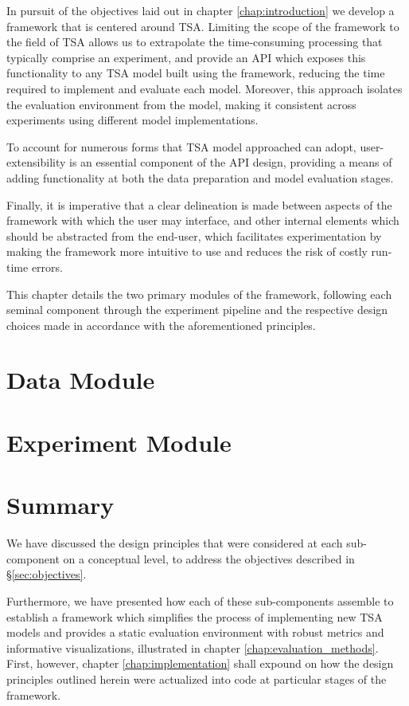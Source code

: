 \documentclass[../../fyp.tex]{subfiles}
\begin{document}
In pursuit of the objectives laid out in chapter \ref{chap:introduction} we develop a framework that is centered around TSA. Limiting the scope of the framework to the field of TSA allows us to extrapolate the time-consuming processing that typically comprise an experiment, and provide an API which exposes this functionality to any TSA model built using the framework, reducing the time required to implement and evaluate each model. 
Moreover, this approach isolates the evaluation environment from the model, making it consistent across experiments using different model implementations.

To account for numerous forms that TSA model approached can adopt, user-extensibility is an essential component of the API design, providing a means of adding functionality at both the data preparation and model evaluation stages. 

Finally, it is imperative that a clear delineation is made between aspects of the framework with which the user may interface, and other internal elements which should be abstracted from the end-user, which facilitates experimentation by making the framework more intuitive to use and reduces the risk of costly run-time errors.  

This chapter details the two primary modules of the framework, following each seminal component through the experiment pipeline and the respective design choices made in accordance with the aforementioned principles.

\section{Data Module}


\section{Experiment Module} \label{sec:experiment_module}


\section{Summary}
We have discussed the design principles that were considered at each sub-component on a conceptual level, to address the objectives described in \S\ref{sec:objectives}. 

Furthermore, we have presented how each of these sub-components assemble to establish a framework which simplifies the process of implementing new TSA models and provides a static evaluation environment with robust metrics and informative visualizations, illustrated in chapter \ref{chap:evaluation_methods}. First, however, chapter \ref{chap:implementation} shall expound on how the design principles outlined herein were actualized into code at particular stages of the framework.
\end{document}
